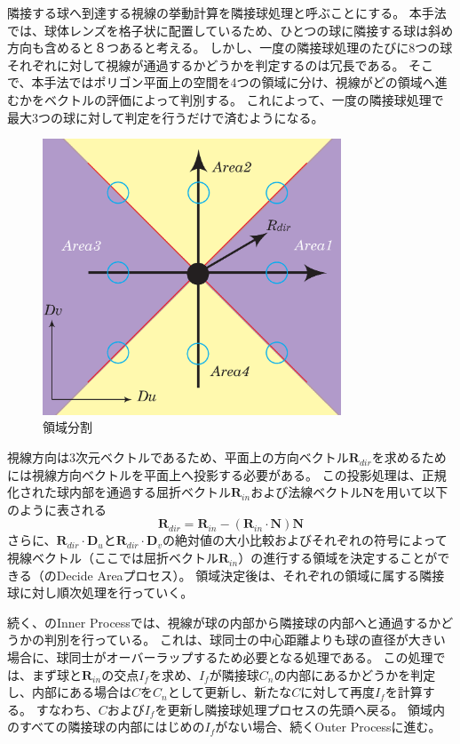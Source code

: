 隣接する球へ到達する視線の挙動計算を隣接球処理と呼ぶことにする。
本手法では、球体レンズを格子状に配置しているため、ひとつの球に隣接する球は斜め方向も含めると８つあると考える。
しかし、一度の隣接球処理のたびに8つの球それぞれに対して視線が通過するかどうかを判定するのは冗長である。
そこで、本手法ではポリゴン平面上の空間を4つの領域に分け、視線がどの領域へ進むかをベクトルの評価によって判別する。
これによって、一度の隣接球処理で最大3つの球に対して判定を行うだけで済むようになる。
\begin{figure}[h]
  \centering
  \includegraphics[width=3.5in]{./img/area_division.eps}
  \caption{領域分割}
  \label{FArea}
\end{figure}

視線方向は3次元ベクトルであるため、平面上の方向ベクトル$\bm{R}_{dir}$を求めるためには視線方向ベクトルを平面上へ投影する必要がある。
この投影処理は、正規化された球内部を通過する屈折ベクトル$\bm{R}_{in}$および法線ベクトル$\bm{N}$を用いて以下のように表される
\begin{equation}
\label{ERdir}
\bm{R}_{dir} = \bm{R}_{in} - ( \bm{R}_{in} \cdot \bm{N} )\bm{N}
\end{equation}
さらに、$\bm{R}_{dir} \cdot \bm{D}_{u}$と$\bm{R}_{dir} \cdot \bm{D}_{v}$の絶対値の大小比較およびそれぞれの符号によって視線ベクトル（ここでは屈折ベクトル$\bm{R}_{in}$）の進行する領域を決定することができる（のDecide Areaプロセス）。
領域決定後は、それぞれの領域に属する隣接球に対し順次処理を行っていく。

続く、のInner Processでは、視線が球の内部から隣接球の内部へと通過するかどうかの判別を行っている。
これは、球同士の中心距離よりも球の直径が大きい場合に、球同士がオーバーラップするため必要となる処理である。
この処理では、まず球と$\bm{R}_{in}$の交点$I_f$を求め、$I_f$が隣接球$C_n$の内部にあるかどうかを判定し、内部にある場合は$C$を$C_n$として更新し、新たな$C$に対して再度$I_f$を計算する。
すなわち、$C$および$I_f$を更新し隣接球処理プロセスの先頭へ戻る。
領域内のすべての隣接球の内部にはじめの$I_f$がない場合、続くOuter Processに進む。

